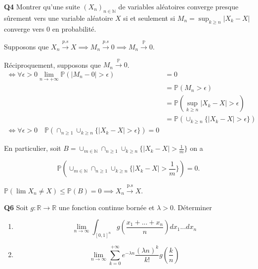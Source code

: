 \documentclass[french]{article}
\begin{document}
\newpage

\begin{tcolorbox}[colback=gray!5!white,colframe=gray!75!black]
	\textbf{\large{Q4}}  Montrer qu'une suite $(X_n)_{n \in \mathbb{N}}$ de variables aléatoires converge presque sûrement vers une variable aléatoire $X$ si et seulement si $M_n = \sup_{k \geq n} |X_k - X|$ converge vers $0$ en probabilité.
\end{tcolorbox}

Supposons que $X_n \xrightarrow{p.s} X \implies M_n \xrightarrow{p.s} 0 \implies M_n \xrightarrow{\mathbb{P}} 0$.

Réciproquement, supposons que $M_n \xrightarrow{\mathbb{P}} 0$.
\begin{align*}
	\iff \forall \epsilon > 0 \lim\limits_{n \to +\infty} \mathbb{P}(|M_n - 0| > \epsilon) &= 0 \\
	&= \mathbb{P}(M_n > \epsilon)\\
	&= \mathbb{P}(\sup_{k \geq n} |X_k - X| > \epsilon)\\
	&= \mathbb{P}(\cup_{k \geq n} \{|X_k - X | > \epsilon\})\\
	\iff \forall \epsilon > 0 \quad \mathbb{P}(\cap_{n \geq 1} \cup_{k \geq n} \{|X_k - X| > \epsilon\}) = 0
\end{align*}

En particulier, soit $B = \cup_{m \in \mathbb{N}} \cap_{n \geq 1} \cup_{k \geq n} \{|X_k - X| > \frac{1}{m}\}$ on a

\[\mathbb{P}\left(\cup_{m \in \mathbb{N}} \cap_{n \geq 1} \cup_{k \geq n} \{|X_k - X| > \frac{1}{m}\}\right) = 0.\]

$\mathbb{P}(\lim X_n \neq X) \leq \mathbb{P}(B) = 0 \implies X_n \xrightarrow{\text{p.s}} X$.

\newpage

\begin{tcolorbox}[colback=gray!5!white,colframe=gray!75!black]
	\textbf{\large{Q6}} Soit $g: \mathbb{R} \to \mathbb{R}$ une fonction continue bornée et $\lambda > 0$. Déterminer
	\begin{enumerate}
		\item
		\[\lim_{n \to \infty} \int_{[0,1]^n} g\left(\frac{x_1+...+x_n}{n}\right)dx_1...dx_n\]
		\item
		\[\lim_{n \to \infty} \sum_{k=0}^{+\infty} e^{-\lambda n} \frac{(\lambda n)^k}{k!}g\left(\frac{k}{n}\right)\]
	\end{enumerate}
\end{tcolorbox}
\end{document}
